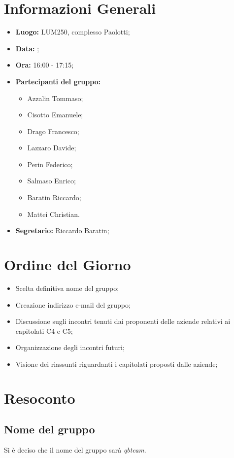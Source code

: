 \section{Informazioni Generali}
\begin{itemize}
\item \textbf{Luogo:} LUM250, complesso Paolotti;
\item \textbf{Data:} \Data;
\item \textbf{Ora:} 16:00 - 17:15;
\item \textbf{Partecipanti del gruppo:}
	\begin{itemize}
	\item Azzalin Tommaso; 
	\item Cisotto Emanuele; 
	\item Drago Francesco;
	\item Lazzaro Davide;
	\item Perin Federico;
	\item Salmaso Enrico;
	\item Baratin Riccardo;
	\item Mattei Christian.
	\end{itemize} 
\item \textbf{Segretario:} Riccardo Baratin;
\end{itemize}


\section{Ordine del Giorno}
\begin{itemize}
	\item Scelta definitiva nome del gruppo;
	\item Creazione indirizzo e-mail del gruppo;
	\item Discussione sugli incontri tenuti dai proponenti delle aziende relativi ai capitolati C4 e C5;
	\item Organizzazione degli incontri futuri;
	\item Visione dei riassunti riguardanti i capitolati proposti dalle aziende;
	
\end{itemize}


\section{Resoconto}
\subsection{Nome del gruppo}
Si è deciso che il nome del gruppo sarà \textit{qbteam}.

